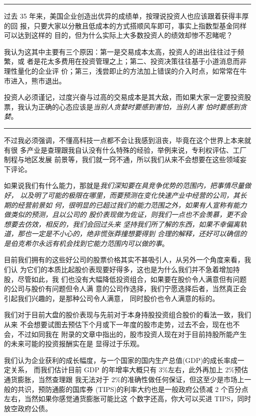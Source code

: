 \documentclass[UTF8,a4paper,zihao=-4,fontset = windows]{ctexart} %
\begin{document}
\rule{10cm}{0.4pt}

过去 35 年来，美国企业创造出优异的成绩单，按理说投资人也应该跟着获得丰厚的回
报，只要大家以分散且低成本的方式搭顺风车即可，事实上指数型基金同样可以达到这样的
目的，但为什么实际上大多数投资人的绩效却惨不忍睹呢？

我认为这其中主要有三个原因：第一是交易成本太高，投资人的进出往往过于频繁，或
者是花太多费用在投资管理之上；第二、投资决策往往基于小道消息而非理性量化的企业评
价；第三，浅尝即止的方法加上错误的介入时点，如常常在牛市进入，熊市退出。

投资人必须谨记，过度兴奋与过高的交易成本是其大敌，而如果大家一定要投资股票，我认为正确的心态应该是\textit{当别人贪婪时要感到害怕，当别人害
怕时要感到贪婪}。

\rule{10cm}{0.4pt}

不过我必须强调，不懂高科技一点都不会让我感到沮丧，毕竟在这个世界上本来就有很
多产业是查理跟我自认没有什么特殊的经验，举例来说，专利权评估、工厂制程与地区发展
前景等，我们就一窍不通，所以我们从来不会想要在这些领域妄下评论。

如果说我们有什么能力，那就是\textit{我们深知要在具竞争优势的范围内，把事情尽量做好，
以及明了可能的极限在哪里，而要预测在变化快速产业中经营的公司，其长期的经营前景如
何，很明显的已超过我们的能力范围之外，如果有人宣称有能力做类似的预测，且以公司的
股价表现做为佐证，则我们一点也不会羡慕，更不会想要去仿效，相反的，我们会回过头来
坚持我们所了解的东西，如果不幸偏离轨道，那也一定是不小心的，绝非慌张莽撞想要得到
合理的解释，还好可以确信的是伯克希尔永远有机会找到它能力范围内可以做的事}。

目前我们拥有的这些好公司的股票价格其实不甚吸引人，从另外一个角度来看，我们认
为它们的本质比起股价表现要好得多，这也是为什么我们并不急着增加持股，尽管如此，我
们也没有大幅降低投资组合，如果要在股价令人满意但有问题的公司与股价有问题但令人满
意的公司作选择，我们宁愿选择后者，当然真正会引起我们兴趣的，是那种公司令人满意，
同时股价也令人满意的标的。

我们对于目前大盘的股价表现与先前对于本身持股投资组合股价的看法一致，我们从来
不会想要试图去预估下个月或下一年度的股市走势，过去不会，现在也不会，不过如同我在
附录的文章中指出的，股市投资人现在对于目前持股所能产生的未来可能的投资报酬实在是
显得过于乐观。

我们认为企业获利的成长幅度，与一个国家的国内生产总值(GDP)的成长率成一定关系，
而我们估计目前 GDP 的年增率大概只有 3\%左右，此外再加上 2\%预估通货膨胀，当然查理跟
我无法对于 2\%的准确性做任何保证，但这至少是市场上一般的共识，预防通膨的国库券
(TIPS)的利率大约也是一般政府公债减 2 个百分点左右，当然如果你感觉通货膨胀可能比这
个数字还高，你大可以买进 TIPS，同时放空政府公债。
\end{document}
